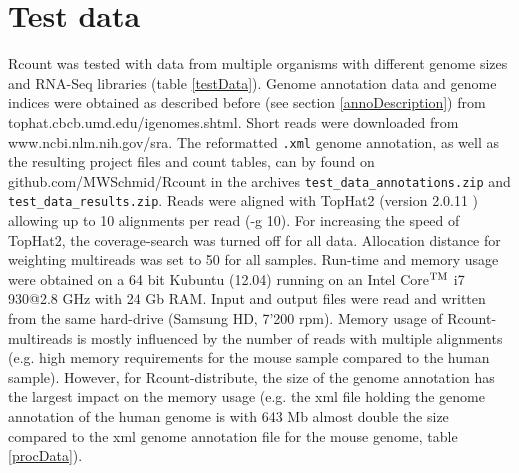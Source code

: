\documentclass[a4paper,10pt]{article}
\newcommand{\myWeb}{github.com/MWSchmid/Rcount}
\begin{document}
\section{Test data}\label{testDataPart}
Rcount was tested with data from multiple organisms with different genome sizes and RNA-Seq libraries (table \ref{testData}). Genome annotation data and genome indices were obtained as described before (see section \ref{annoDescription}) from tophat.cbcb.umd.edu/igenomes.shtml. Short reads were downloaded from www.ncbi.nlm.nih.gov/sra. The reformatted \texttt{.xml} genome annotation, as well as the resulting project files and count tables, can by found on {\myWeb} in the archives \texttt{test\_data\_annotations.zip} and \texttt{test\_data\_results.zip}. Reads were aligned with TopHat2 (version 2.0.11 \cite{2013_Kim}) allowing up to 10 alignments per read (-g 10). For increasing the speed of TopHat2, the coverage-search was turned off for all data. Allocation distance for weighting multireads was set to 50 for all samples. Run-time and memory usage were obtained on a 64 bit Kubuntu (12.04) running on an Intel{\textregistered} {Core$^{\textup{TM}}$} i7 930@2.8 GHz with 24 Gb RAM. Input and output files were read and written from the same hard-drive (Samsung HD, 7'200 rpm). Memory usage of Rcount-multireads is mostly influenced by the number of reads with multiple alignments (e.g. high memory requirements for the mouse sample compared to the human sample). However, for Rcount-distribute, the size of the genome annotation has the largest impact on the memory usage (e.g. the xml file holding the genome annotation of the human genome is with 643 Mb almost double the size compared to the xml genome annotation file for the mouse genome, table \ref{procData}).
\end{document}
